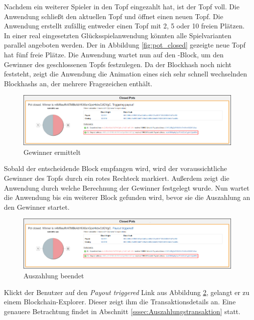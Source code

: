 Nachdem ein weiterer Spieler in den Topf eingezahlt hat, ist der Topf voll. Die Anwendung schließt den aktuellen Topf und öffnet einen neuen Topf. Die Anwendung erstellt zufällig entweder einen Topf mit 2, 5 oder 10 freien Plätzen. In einer real eingesetzten Glücksspielanwendung könnten alle Spielvarianten parallel angeboten werden. Der in Abbildung \ref{fig:pot_closed} gezeigte neue Topf hat fünf freie Plätze. Die Anwendung wartet nun auf den -Block, um den Gewinner des geschlossenen Topfs festzulegen. Da der Blockhash noch nicht feststeht, zeigt die Anwendung die Animation eines sich sehr schnell wechselnden Blockhashs an, der mehrere Fragezeichen enthält.

\begin{figure}[H]
\centering
\includegraphics[width=1\linewidth]{Figures/btc_gui/pot_closed_triggering_payout}
\decoRule
\caption{Gewinner ermittelt}
\label{fig:pot_closed_triggering_payout}
\end{figure}
Sobald der entscheidende Block empfangen wird, wird der voraussichtliche Gewinner des Topfs durch ein rotes Rechteck markiert. Außerdem zeigt die Anwendung durch welche Berechnung der Gewinner festgelegt wurde. Nun wartet die Anwendung bis ein weiterer Block gefunden wird, bevor sie die Auszahlung an den Gewinner startet. 

\begin{figure}[H]
\centering
\includegraphics[width=1\linewidth]{Figures/btc_gui/pot_closed_payout_finished}
\decoRule
\caption{Auszahlung beendet}
\label{fig:pot_closed_payout_finished}
\end{figure}

Klickt der Benutzer auf den \emph{Payout triggered} Link aus Abbildung \ref{fig:pot_closed_payout_finished}, gelangt er zu einem Blockchain-Explorer. Dieser zeigt ihm die Transaktionsdetails an. Eine genauere Betrachtung findet in Abschnitt \ref{sssec:Auszahlungstransaktion} statt.
